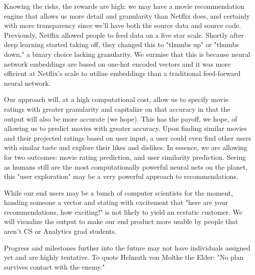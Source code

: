 \documentclass[sigchi, 12pt, nonacm=true, timestamp=true, screen=true]{acmart}
\begin{document}
Knowing the risks, the rewards are high: we may have a movie recommendation engine that allows us more detail and granularity than Netflix does, and certainly with more transparency since we'll have both the source data and source code. Previously, Netflix allowed people to feed data on a five star scale. Shortly after deep learning started taking off, they changed this to "thumbs up" or "thumbs down," a binary choice lacking granularity. We surmise that this is because neural network embeddings are based on one-hot encoded vectors and it was more efficient at Netflix's scale to utilize embeddings than a traditional feed-forward neural network.

Our approach will, at a high computational cost, allow us to specify movie ratings with greater granularity and capitalize on that accuracy in that the output will also be more accurate (we hope). This has the payoff, we hope, of allowing us to predict movies with greater accuracy. Upon finding similar movies and their projected ratings based on user input, a user could even find other users with similar taste and explore their likes and dislikes. In essence, we are allowing for two outcomes: movie rating prediction, and user similarity prediction. Seeing as humans still are the most computationally powerful neural nets on the planet, this "user exploration" may be a very powerful approach to recommendations.

While our end users may be a bunch of computer scientists for the moment, handing someone a vector and stating with excitement that "here are your recommendations, how exciting!" is not likely to yield an ecstatic customer. We will visualize the output to make our end product more usable by people that aren't CS or Analytics grad students.

	


Progress and milestones further into the future may not have individuals assigned yet and are highly tentative. To quote Helmuth von Moltke the Elder: "No plan survives contact with the enemy."
\end{document}
